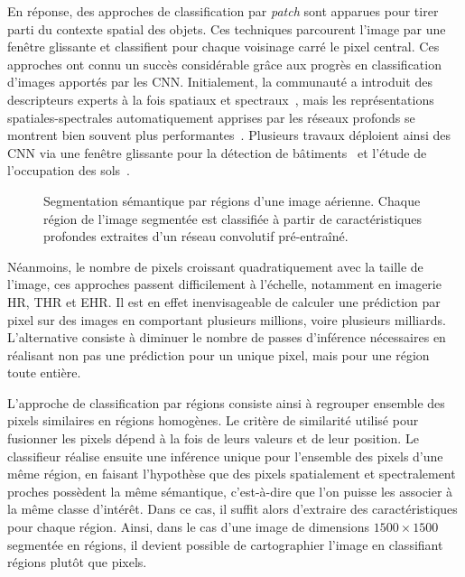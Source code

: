 En réponse, des approches de classification par \emph{patch} sont apparues pour tirer parti du contexte spatial des objets. Ces techniques parcourent l'image par une fenêtre glissante et classifient pour chaque voisinage carré le pixel central. Ces approches ont connu un succès considérable grâce aux progrès en classification d'images apportés par les \gls{CNN}. Initialement, la communauté a introduit des descripteurs experts à la fois spatiaux et spectraux~\cite{fauvel_advances_2013}, mais les représentations spatiales-spectrales automatiquement apprises par les réseaux profonds se montrent bien souvent plus performantes~\cite{nogueira_learning_2016,chen_deep_2016}. Plusieurs travaux déploient ainsi des \gls{CNN} via une fenêtre glissante pour la détection de bâtiments~\cite{vakalopoulou_building_2015} et l'étude de l'occupation des sols~\cite{papadomanolaki_patch-based_2017}.

\begin{figure}
\resizebox{\textwidth}{!}{%

}
\caption{Segmentation sémantique par régions d'une image aérienne. Chaque région de l'image segmentée est classifiée à partir de caractéristiques profondes extraites d'un réseau convolutif pré-entraîné.}
\label{fig:framework}
\end{figure}

Néanmoins, le nombre de pixels croissant quadratiquement avec la taille de l'image, ces approches passent difficilement à l'échelle, notamment en imagerie \gls{HR}, \gls{THR} et \gls{EHR}. Il est en effet inenvisageable de calculer une prédiction par pixel sur des images en comportant plusieurs millions, voire plusieurs milliards. L'alternative consiste à diminuer le nombre de passes d'inférence nécessaires en réalisant non pas une prédiction pour un unique pixel, mais pour une région toute entière.

L'approche de classification par régions consiste ainsi à regrouper ensemble des pixels similaires en régions homogènes. Le critère de similarité utilisé pour fusionner les pixels dépend à la fois de leurs valeurs et de leur position. Le classifieur réalise ensuite une inférence unique pour l'ensemble des pixels d'une même région, en faisant l'hypothèse que des pixels spatialement et spectralement proches possèdent la même sémantique, c'est-à-dire que l'on puisse les associer à la même classe d'intérêt. Dans ce cas, il suffit alors d'extraire des caractéristiques pour chaque région. Ainsi, dans le cas d'une image de dimensions $1 500\times1 500$ segmentée en  régions, il devient possible de cartographier l'image en classifiant  régions plutôt que  pixels.

